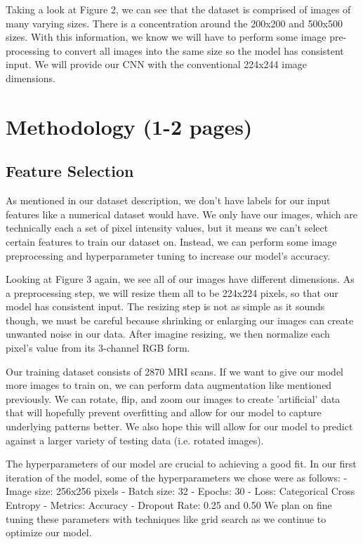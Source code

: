 \documentclass[conference]{IEEEtran}
\begin{document}
Taking a look at Figure 2, we can see that the dataset is comprised of images of many varying sizes. There is a concentration around the 200x200 and 500x500 sizes. With this information, we know we will have to perform some image pre-processing to convert all images into the same size so the model has consistent input. We will provide our CNN with the conventional 224x244 image dimensions.

\section{\large Methodology (1-2 pages)}

\subsection{\large Feature Selection}
As mentioned in our dataset description, we don't have labels for our input features like a numerical dataset would have. We only have our images, which are technically each a set of pixel intensity values, but it means we can't select certain features to train our dataset on. Instead, we can perform some image preprocessing and hyperparameter tuning to increase our model's accuracy.

Looking at Figure 3 again, we see all of our images have different dimensions. As a preprocessing step, we will resize them all to be 224x224 pixels, so that our model has consistent input.  The resizing step is not as simple as it sounds though, we must be careful because shrinking or enlarging our images can create unwanted noise in our data. After imagine resizing, we then normalize each pixel's value from its 3-channel RGB form.

Our training dataset consists of 2870 MRI scans. If we want to give our model more images to train on, we can perform data augmentation like mentioned previously. We can rotate, flip, and zoom our images to create 'artificial' data that will hopefully prevent overfitting and allow for our model to capture underlying patterns better. We also hope this will allow for our model to predict against a larger variety of testing data (i.e. rotated images). 

The hyperparameters of our model are crucial to achieving a good fit. In our first iteration of the model, some of the hyperparameters we chose were as follows:
- Image size: 256x256 pixels		- Batch size: 32		- Epochs: 30	
- Loss:  Categorical Cross Entropy 	- Metrics: Accuracy		- Dropout Rate: 0.25 and 0.50
We plan on fine tuning these parameters with techniques like grid search as we continue to optimize our model. 
\end{document}
